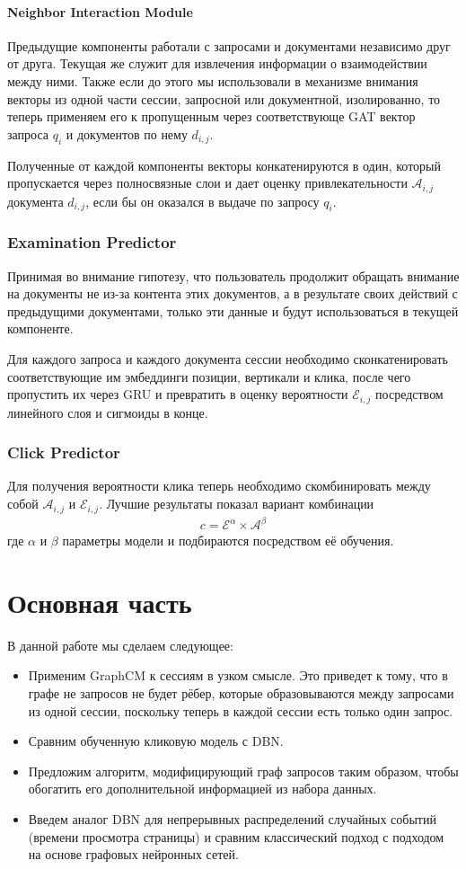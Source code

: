 \documentclass[diploma]{nanolab2015}
\begin{document}
\subsubsection{Neighbor Interaction Module}
Предыдущие компоненты работали с запросами и документами независимо друг от друга. Текущая же служит для извлечения информации о взаимодействии между ними. Также если до этого мы использовали в механизме внимания векторы из одной части сессии, запросной или документной, изолированно, то теперь применяем его к пропущенным через соответствующе GAT вектор запроса $q_i$ и документов по нему $d_{i,j}$.

Полученные от каждой компоненты векторы конкатенируются в один, который пропускается через полносвязные слои и дает оценку привлекательности $\mathcal{A}_{i,j}$ документа $d_{i,j}$, если бы он оказался в выдаче по запросу ${q_i}$.

\subsection{Examination Predictor}
Принимая во внимание гипотезу, что пользователь продолжит обращать внимание на документы не из-за контента этих документов, а в результате своих действий с предыдущими документами, только эти данные и будут использоваться в текущей компоненте.

Для каждого запроса и каждого документа сессии необходимо сконкатенировать соответствующие им эмбеддинги позиции, вертикали и клика, после чего пропустить их через GRU и превратить в оценку вероятности $\mathcal{E}_{i,j}$ посредством линейного слоя и сигмоиды в конце.

\subsection{Click Predictor}
Для получения вероятности клика теперь необходимо скомбинировать между собой $\mathcal{A}_{i,j}$ и $\mathcal{E}_{i,j}$. Лучшие результаты показал вариант комбинации
\begin{align}
    c = \mathcal{E}^\alpha \times \mathcal{A}^\beta
\end{align}
где $\alpha$ и $\beta$ параметры модели и подбираются посредством её обучения.
\chapter{Основная часть}
В данной работе мы сделаем следующее:
\begin{itemize}
    \item Применим GraphCM к сессиям в узком смысле. Это приведет к тому, что в графе не запросов не будет рёбер, которые образовываются между запросами из одной сессии, поскольку теперь в каждой сессии есть только один запрос.
    \item Сравним обученную кликовую модель с DBN.
    \item Предложим алгоритм, модифицирующий граф запросов таким образом, чтобы обогатить его дополнительной информацией из набора данных.
    \item Введем аналог DBN для непрерывных распределений случайных событий (времени просмотра страницы) и сравним классический подход с подходом на основе графовых нейронных сетей.
\end{itemize}
\end{document}
